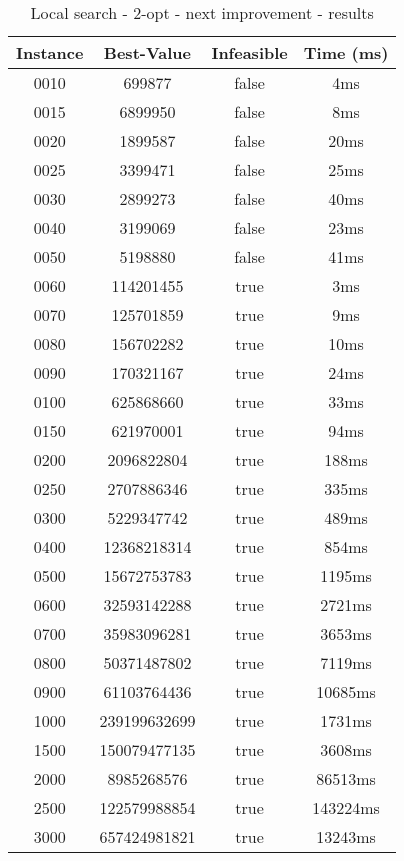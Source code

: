 \begin{table}[H]
	\centering
	\begin{tabular}{|| c | c | c | c ||} 
		\hline
		Instance & Best-Value & Infeasible & Time (ms) \\
		\hline\hline
		0010 & 699877 & false & 4ms \\
		0015 & 6899950 & false & 8ms \\
		0020 & 1899587 & false & 20ms \\
		0025 & 3399471 & false & 25ms \\
		0030 & 2899273 & false & 40ms \\
		0040 & 3199069 & false & 23ms \\
		0050 & 5198880 & false & 41ms \\
		0060 & 114201455 & true & 3ms \\
		0070 & 125701859 & true & 9ms \\
		0080 & 156702282 & true & 10ms \\
		0090 & 170321167 & true & 24ms \\
		0100 & 625868660 & true & 33ms \\
		0150 & 621970001 & true & 94ms \\
		0200 & 2096822804 & true & 188ms \\
		0250 & 2707886346 & true & 335ms \\
		0300 & 5229347742 & true & 489ms \\
		0400 & 12368218314 & true & 854ms \\
		0500 & 15672753783 & true & 1195ms \\
		0600 & 32593142288 & true & 2721ms \\
		0700 & 35983096281 & true & 3653ms \\
		0800 & 50371487802 & true & 7119ms \\
		0900 & 61103764436 & true & 10685ms \\
		1000 & 239199632699 & true & 1731ms \\
		1500 & 150079477135 & true & 3608ms \\
		2000 & 8985268576 & true & 86513ms \\
		2500 & 122579988854 & true & 143224ms \\
		3000 & 657424981821 & true & 13243ms \\
		\hline
	\end{tabular}
	\caption{Local search - 2-opt - next improvement - results}
\end{table}


